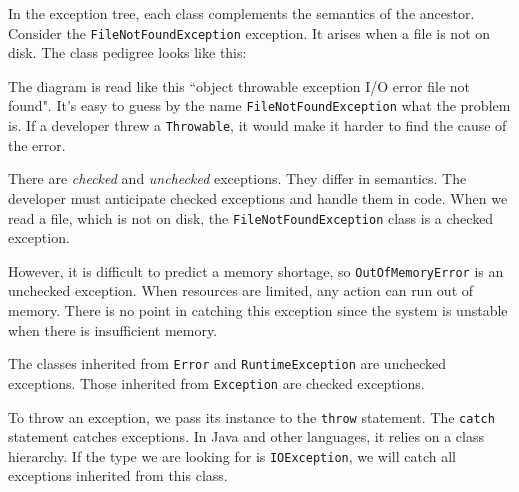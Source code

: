In the exception tree, each class complements the semantics of the ancestor. Consider the \verb|FileNotFoundException| exception. It arises when a file is not on disk. The class pedigree looks like this:

\linegap

\ifx\DEVICETYPE\MOBILE


\else


\fi

\linegap

\mnoindent
The diagram is read like this “object \arr throwable \arr exception \arr I/O error \arr file not found". It's easy to guess by the name \verb|FileNotFoundException| what the problem is. If a developer threw a \verb|Throwable|, it would make it harder to find the cause of the error.

There are \emph{checked} and \emph{unchecked} exceptions.
They differ in semantics. The developer must anticipate checked exceptions and handle them in code. When we read a file, which is not on disk, the \verb|FileNotFoundException| class is a checked exception.


\label{exc-hierarchy}

However, it is difficult to predict a memory shortage, so \verb|OutOfMemoryError| is an unchecked exception. When resources are limited, any action can run out of memory. There is no point in catching this exception since the system is unstable when there is insufficient memory.


The classes inherited from \verb|Error| and \texttt{Runtime\-Exception} are unchecked exceptions. Those inherited from \verb|Exception| are checked exceptions.


To throw an exception, we pass its instance to the \verb|throw| statement. The \verb|catch| statement catches exceptions. In Java and other languages, it relies on a class hierarchy. If the type we are looking for is \verb|IOException|, we will catch all exceptions inherited from this class.

